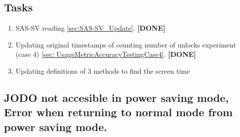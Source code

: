 \documentclass{article}
\begin{document}
\subsection{Tasks}
\begin{enumerate}
    \item SAS-SV reading \ref{sec:SAS-SV_Update}. \hfill \textbf{[DONE]}
    \item Updating original timestamps of counting number of unlocks experiment (case 4) \ref{sec: UsageMetricAccuracyTestingCase4}. \hfill \textbf{[DONE]}
    \item Updating definitions of 3 methods to find the screen time
\end{enumerate}

\subsection{JODO not accesible in power saving mode, Error when returning to normal mode from power saving mode.}
\end{document}
